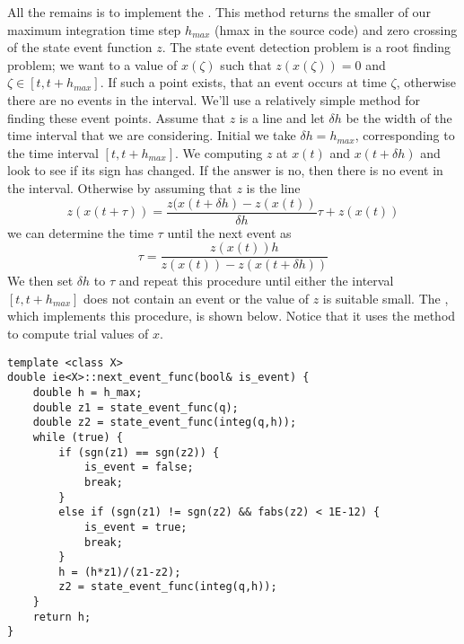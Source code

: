 All the remains is to implement the . This method returns the smaller of our maximum integration time step $h_{max}$ (hmax in the source code) and zero crossing of the state event function $z$. The state event detection problem is a root finding problem; we want to a value of $x(\zeta)$ such that $z(x(\zeta)) = 0$ and $\zeta \in [t,t+h_{max}]$. If such a point exists, that an event occurs at time $\zeta$, otherwise there are no events in the interval. We'll use a relatively simple method for finding these event points. Assume that $z$ is a line and let $\delta h$ be the width of the time interval that we are considering. Initial we take $\delta h = h_{max}$, corresponding to the time interval $[t,t+h_{max}]$. We computing $z$ at $x(t)$ and $x(t+\delta h)$ and look to see if its sign has changed. If the answer is no, then there is no event in the interval. Otherwise by assuming that $z$ is the line 
\begin{equation*}
z(x(t+\tau)) = \frac{z(x(t+\delta h)-z(x(t))}{\delta h}\tau + z(x(t))
\end{equation*}
we can determine the time $\tau$ until the next event as
\begin{equation*}
\tau = \frac{z(x(t))h}{z(x(t))-z(x(t+\delta h))}
\end{equation*}
We then set $\delta h$ to $\tau$ and repeat this procedure until either the interval $[t,t+h_{max}]$ does not contain an event or the value of $z$ is suitable small. The , which implements this procedure, is shown below. Notice that it uses the  method to compute trial values of $x$.
\begin{verbatim}
template <class X>
double ie<X>::next_event_func(bool& is_event) {
    double h = h_max;
    double z1 = state_event_func(q);
    double z2 = state_event_func(integ(q,h));
    while (true) {
        if (sgn(z1) == sgn(z2)) {
            is_event = false;
            break;
        }
        else if (sgn(z1) != sgn(z2) && fabs(z2) < 1E-12) {
            is_event = true;
            break;
        }
        h = (h*z1)/(z1-z2);
        z2 = state_event_func(integ(q,h));
    }
    return h;
}
\end{verbatim}

